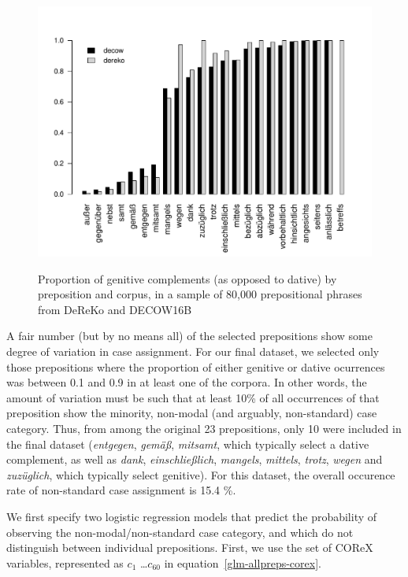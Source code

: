 \begin{figure}
   \includegraphics[scale=.7]{../R/prep-genitive-proportions}
   \label{genprops}
  \caption{Proportion of genitive complements (as opposed to dative) by preposition and corpus, in a sample of 80,000 prepositional phrases from DeReKo and DECOW16B}  
\end{figure}


A fair number (but by no means all) of the selected prepositions show some degree of variation in case assignment. For our final dataset, we selected only those prepositions where the proportion of either genitive or dative ocurrences was between 0.1 and 0.9 in at least one of the corpora. In other words, the amount of variation must be such that at least 10\% of all occurrences of that preposition show the minority, non-modal (and arguably, non-standard) case category. Thus, from among the original 23 prepositions, only 10 were included in the final dataset (\textit{entgegen}, \textit{gem\"a\ss}, \textit{mitsamt}, which typically select a dative complement, as well as \textit{dank}, \textit{einschlie{\ss}lich}, \textit{mangels}, \textit{mittels}, \textit{trotz}, \textit{wegen} and \textit{zuz\"uglich}, which typically select genitive). For this dataset, the overall occurence rate of non-standard case assignment is 15.4 \%.

We first specify two logistic regression models that predict the probability of observing the non-modal/non-standard case category, and which do not distinguish between individual prepositions. First, we use the set of COReX variables, represented as $c_1$ \ldots $c_{60}$ in equation~\ref{glm-allpreps-corex}.

